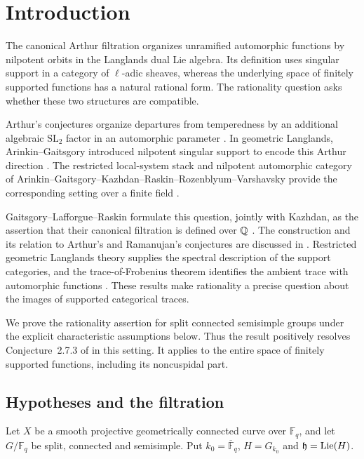 \section{Introduction}

The canonical Arthur filtration organizes unramified automorphic functions
by nilpotent orbits in the Langlands dual Lie algebra. Its definition uses
singular support in a category of $\ell$-adic sheaves, whereas the underlying
space of finitely supported functions has a natural rational form. The
rationality question asks whether these two structures are compatible.

Arthur's conjectures organize departures from temperedness by an
additional algebraic $\mathrm{SL}_2$ factor in an automorphic parameter
\cite[Sections~4 and~8]{Arthur1989}. In geometric Langlands, Arinkin--Gaitsgory
introduced nilpotent singular support to encode this Arthur direction
\cite[Sections~1.1.2--1.1.6]{ArinkinGaitsgorySingularSupport}.
The restricted local-system stack and nilpotent automorphic category of
Arinkin--Gaitsgory--Kazhdan--Raskin--Rozenblyum--Varshavsky provide the
corresponding setting over a finite field \cite{AGKRRV1}.

Gaitsgory--Lafforgue--Raskin formulate this question, jointly with Kazhdan,
as the assertion that their canonical filtration is defined over $\mathbb Q$
\cite[Section~2.7, Conjecture~2.7.3]{GLR}. The construction and its relation
to Arthur's and Ramanujan's conjectures are discussed in
\cite{GLR,Raskin}. Restricted geometric Langlands theory supplies the
spectral description of the support categories, and the trace-of-Frobenius
theorem identifies the ambient trace with automorphic functions
\cite{AGKRRV1,AGKRRV3,GR}. These results make rationality a precise question
about the images of supported categorical traces.

We prove the rationality assertion for split connected semisimple groups
under the explicit characteristic assumptions below. Thus the result
positively resolves Conjecture~2.7.3 of \cite{GLR} in this setting. It
applies to the entire space of finitely supported functions, including its
noncuspidal part.

\subsection{Hypotheses and the filtration}

Let $X$ be a smooth projective geometrically connected curve over
$\mathbb F_q$, and let $G/\mathbb F_q$ be split, connected and semisimple.
Put $k_0=\overline{\mathbb F}_q$, $H=G_{k_0}$ and
$\mathfrak h=\operatorname{Lie}(H)$.

